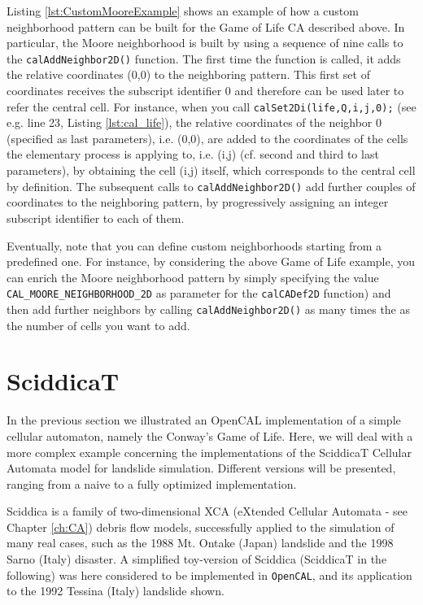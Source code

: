 Listing \ref{lst:CustomMooreExample} shows an example of how a custom
neighborhood pattern can be built for the Game of Life CA described
above. In particular, the Moore neighborhood is built by using a
sequence of nine calls to the \verb'calAddNeighbor2D()' function. The
first time the function is called, it adds the relative coordinates
(0,0) to the neighboring pattern. This first set of coordinates
receives the subscript identifier 0 and therefore can be used later to
refer the central cell. For instance, when you call
\verb'calSet2Di(life,Q,i,j,0);' (see e.g. line 23, Listing
\ref{lst:cal_life}), the relative coordinates of the neighbor 0
(specified as last parameters), i.e. (0,0), are added to the
coordinates of the cells the elementary process is applying to,
i.e. (i,j) (cf. second and third to last parameters), by obtaining the
cell (i,j) itself, which corresponds to the central cell by
definition. The subsequent calls to \verb'calAddNeighbor2D()' add
further couples of coordinates to the neighboring pattern, by
progressively assigning an integer subscript identifier to each of
them.

Eventually, note that you can define custom neighborhoods starting
from a predefined one. For instance, by considering the above
Game of Life example, you can enrich the Moore neighborhood pattern
by simply specifying the value \verb'CAL_MOORE_NEIGHBORHOOD_2D' as
parameter for the \verb'calCADef2D' function) and then add further
neighbors by calling \verb'calAddNeighbor2D()' as many times the as
the number of cells you want to add.

\section{SciddicaT}\label{sec:sciddicaT}
In the previous section we illustrated an OpenCAL implementation of a
simple cellular automaton, namely the Conway’s Game of Life. Here, we
will deal with a more complex example concerning the implementations
of the SciddicaT Cellular Automata model for landslide
simulation. Different versions will be presented, ranging from a naive
to a fully optimized implementation.

Sciddica is a family of two-dimensional XCA (eXtended Cellular
Automata - see Chapter \ref{ch:CA}) debris flow models, successfully
applied to the simulation of many real cases, such as the 1988
Mt. Ontake (Japan) landslide and the 1998 Sarno (Italy) disaster. A
simplified toy-version of Sciddica (SciddicaT in the following) was
here considered to be implemented in \verb"OpenCAL", and its
application to the 1992 Tessina (Italy) landslide shown.

